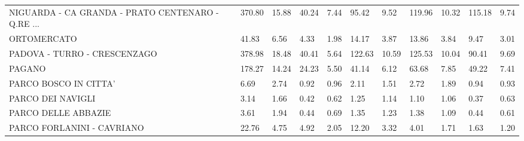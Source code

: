 \begin{table}[H]
{{\begin{tabular}{lp{1.3cm}p{1.3cm}p{1.3cm}p{1.3cm}p{1.3cm}p{1.3cm}p{1.3cm}p{1.3cm}p{1.3cm}p{1.3cm}}
NIGUARDA - CA GRANDA - PRATO CENTENARO - Q.RE ... &                    370.80 &                 15.88 &                       40.24 &                    7.44 &                       95.42 &                    9.52 &                      119.96 &                   10.32 &                    115.18 &                  9.74 \\
ORTOMERCATO                                        &                     41.83 &                  6.56 &                        4.33 &                    1.98 &                       14.17 &                    3.87 &                       13.86 &                    3.84 &                      9.47 &                  3.01 \\
PADOVA - TURRO - CRESCENZAGO                       &                    378.98 &                 18.48 &                       40.41 &                    5.64 &                      122.63 &                   10.59 &                      125.53 &                   10.04 &                     90.41 &                  9.69 \\
PAGANO                                             &                    178.27 &                 14.24 &                       24.23 &                    5.50 &                       41.14 &                    6.12 &                       63.68 &                    7.85 &                     49.22 &                  7.41 \\
PARCO BOSCO IN CITTA'                              &                      6.69 &                  2.74 &                        0.92 &                    0.96 &                        2.11 &                    1.51 &                        2.72 &                    1.89 &                      0.94 &                  0.93 \\
PARCO DEI NAVIGLI                                  &                      3.14 &                  1.66 &                        0.42 &                    0.62 &                        1.25 &                    1.14 &                        1.10 &                    1.06 &                      0.37 &                  0.63 \\
PARCO DELLE ABBAZIE                                &                      3.61 &                  1.94 &                        0.44 &                    0.69 &                        1.35 &                    1.23 &                        1.38 &                    1.09 &                      0.44 &                  0.61 \\
PARCO FORLANINI - CAVRIANO                         &                     22.76 &                  4.75 &                        4.92 &                    2.05 &                       12.20 &                    3.32 &                        4.01 &                    1.71 &                      1.63 &                  1.20 \\

\end{tabular}}}
\end{table}
